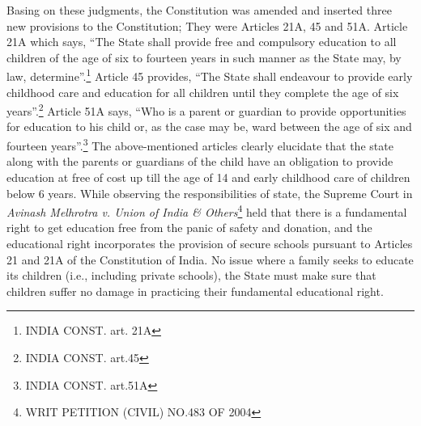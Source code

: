 \begin{multicols}{2}
\noi
Basing on these judgments, the Constitution was amended and inserted three new provisions
to the Constitution; They were Articles 21A, 45 and 51A. Article 21A which says, “The State
shall provide free and compulsory education to all children of the age of six to fourteen years
in such manner as the State may, by law, determine”.\footnote{INDIA CONST. art. 21A} Article 45 provides, “The State shall endeavour to provide early childhood care and education for all children until they complete
the age of six years”.\footnote{INDIA CONST. art.45} Article 51A says, “Who is a parent or guardian to provide
opportunities for education to his child or, as the case may be, ward between the age of six
and fourteen years”.\footnote{INDIA CONST. art.51A} The above-mentioned articles clearly elucidate that the state along with
the parents or guardians of the child have an obligation to provide education at free of cost up
till the age of 14 and early childhood care of children below 6 years. While observing the
responsibilities of state, the Supreme Court in \textit{Avinash Melhrotra v. Union of India \&
Others}\footnote{WRIT PETITION (CIVIL) NO.483 OF 2004} held that there is a fundamental right to get education free from the panic of safety
and donation, and the educational right incorporates the provision of secure schools pursuant
to Articles 21 and 21A of the Constitution of India. No issue where a family seeks to educate
its children (i.e., including private schools), the State must make sure that children suffer no
damage in practicing their fundamental educational right.



\end{multicols}
